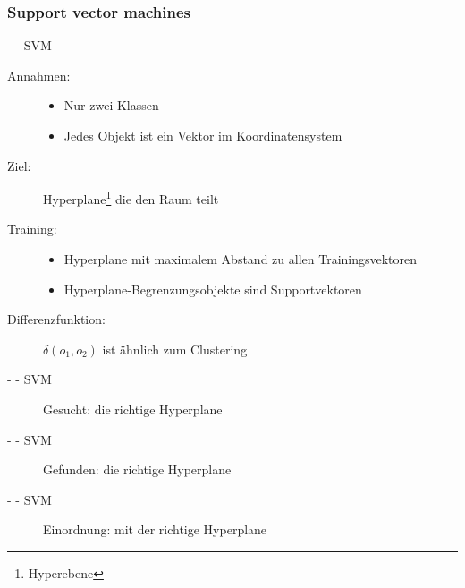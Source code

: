 \documentclass[fleqn,11pt,aspectratio=43]{beamer}
\begin{document}
\subsubsection{Support vector machines~}\label{svm}

\begin{frame}{\insertsectionhead - \insertsubsectionhead - SVM \cite{dwh}}
\begin{description}
\item[Annahmen:]
\begin{itemize}
\item Nur zwei Klassen
\item Jedes Objekt ist ein Vektor im Koordinatensystem
\end{itemize}
\item[Ziel:]  Hyperplane\footnote{Hyperebene} die den Raum teilt 
\item[Training:]
\begin{itemize}
\item Hyperplane mit maximalem Abstand zu allen Trainingsvektoren
\item Hyperplane-Begrenzungsobjekte sind Supportvektoren
\end{itemize} 
\item[Differenzfunktion:] $\delta(o_1, o_2)$ ist ähnlich zum Clustering
\end{description}
\end{frame}

\begin{frame}{\insertsectionhead - \insertsubsectionhead - SVM}
\begin{figure}
\scalebox{.8}{}
\caption{Gesucht: die richtige Hyperplane}
\end{figure}
\end{frame}

\begin{frame}{\insertsectionhead - \insertsubsectionhead - SVM}
\begin{figure}
\scalebox{.8}{}
\caption{Gefunden: die richtige Hyperplane}
\end{figure}
\end{frame}

\begin{frame}{\insertsectionhead - \insertsubsectionhead - SVM}
\begin{figure}
\scalebox{.8}{}
\caption{Einordnung: mit der richtige Hyperplane}
\end{figure}
\end{frame}
\end{document}
